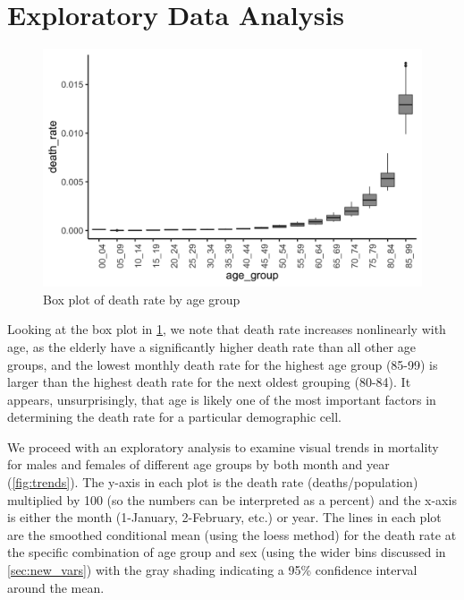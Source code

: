 \documentclass[11pt]{article}
\begin{document}
\section{Exploratory Data Analysis}\label{sec:xplor}
\begin{figure}
\vspace{-5mm}
\centering
\includegraphics[scale=0.08]{figs/box_plot.png}
\vspace{-2.5mm}
\caption{Box plot of death rate by age group}
\label{fig:box}
\end{figure}
Looking at the box plot in \cref{fig:box}, we note that death rate increases nonlinearly with age, as the elderly have a significantly higher death rate than all other age groups, and the lowest monthly death rate for the highest age group (85-99) is larger than the highest death rate for the next oldest grouping (80-84).
It appears, unsurprisingly, that age is likely one of the most important factors in determining the death rate for a particular demographic cell. 
\vspace{2mm}

We proceed with an exploratory analysis to examine visual trends in mortality for males and females of different age groups by both month and year (\cref{fig:trends}).
The y-axis in each plot is the death rate (deaths/population) multiplied by 100 (so the numbers can be interpreted as a percent) and the x-axis is either the month (1-January, 2-February, etc.) or year. 
The lines in each plot are the smoothed conditional mean (using the loess method) for the death rate at the specific combination of age group and sex (using the wider bins discussed in \cref{sec:new_vars}) with the gray shading indicating a 95\% confidence interval around the mean\cite{ggplot}.
\end{document}
